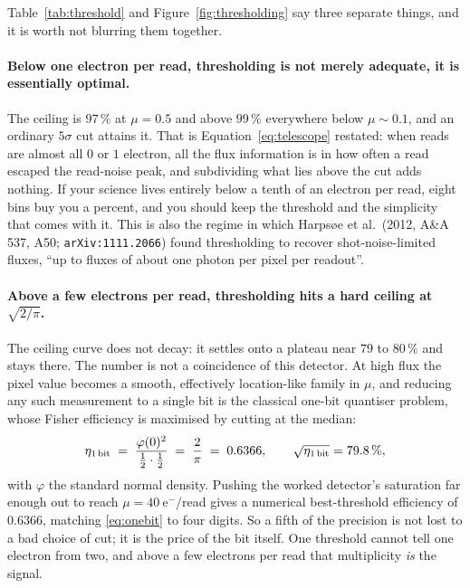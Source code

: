 \documentclass[11pt,a4paper]{article}
\newcommand{\eminus}{\ensuremath{\mathrm{e}^-}}
\begin{document}
Table~\ref{tab:threshold} and Figure~\ref{fig:thresholding} say three separate
things, and it is worth not blurring them together.

\paragraph{Below one electron per read, thresholding is not merely adequate, it
is essentially optimal.} The ceiling is $97\,\%$ at $\mu=0.5$ and above
$99\,\%$ everywhere below $\mu \sim 0.1$, and an ordinary $5\sigma$ cut
attains it. That is Equation~\eqref{eq:telescope} restated: when reads are
almost all $0$ or $1$ electron, all the flux information is in how often a read
escaped the read-noise peak, and subdividing what lies above the cut adds
nothing. If your science lives entirely below a tenth of an electron per read,
eight bins buy you a percent, and you should keep the threshold and the
simplicity that comes with it. This is also the regime in which
Harps\o e et al.\ (2012, A\&A 537, A50; \texttt{arXiv:1111.2066}) found
thresholding to recover shot-noise-limited fluxes, ``up to fluxes of about one
photon per pixel per readout''.

\paragraph{Above a few electrons per read, thresholding hits a hard ceiling at
$\sqrt{2/\pi}$.} The ceiling curve does not decay: it settles onto a plateau
near $79$ to $80\,\%$ and stays there. The number is not a coincidence of this
detector. At high flux the pixel value becomes a smooth, effectively
location-like family in $\mu$, and reducing any such measurement to a single
bit is the classical one-bit quantiser problem, whose Fisher efficiency is
maximised by cutting at the median:
\begin{equation}
  \eta_{\rm 1\,bit} \;=\; \frac{\varphi(0)^2}{\tfrac12 \cdot \tfrac12}
  \;=\; \frac{2}{\pi} \;=\; 0.6366,
  \qquad \sqrt{\eta_{\rm 1\,bit}} = 79.8\,\%,
  \label{eq:onebit}
\end{equation}
with $\varphi$ the standard normal density. Pushing the worked detector's
saturation far enough out to reach $\mu = 40\ \eminus$/read gives a numerical
best-threshold efficiency of $0.6366$, matching \eqref{eq:onebit} to four
digits. So a fifth of the precision is not lost to a bad choice of cut; it is
the price of the bit itself. One threshold cannot tell one electron from two,
and above a few electrons per read that multiplicity \emph{is} the signal.
\end{document}

